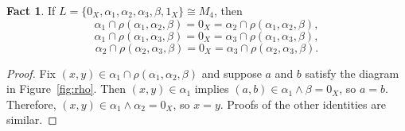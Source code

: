 \documentclass{amsart}
\theoremstyle{plain}
\theoremstyle{definition}
\newtheorem{fact}{Fact}
\theoremstyle{definition}
\numberwithin{equation}{section}
\newcommand{\<}{\ensuremath{\langle}}
\renewcommand{\>}{\ensuremath{\rangle}}
\newcommand{\meet}{\ensuremath{\wedge}}
\begin{document}
\begin{fact} If 
$L = \{0_X, \alpha_1, \alpha_2, \alpha_3, \beta, 1_X\} \cong  M_4$,
then
  \[
\alpha_1 \cap \rho(\alpha_1, \alpha_2, \beta)
= 0_X =  \alpha_2 \cap \rho(\alpha_1, \alpha_2, \beta),
\]
\[
\alpha_1 \cap \rho(\alpha_1, \alpha_3, \beta)
= 0_X =  \alpha_3 \cap \rho(\alpha_1, \alpha_3, \beta),
\]
\[
\alpha_2 \cap \rho(\alpha_2, \alpha_3, \beta)
 = 0_X = \alpha_3 \cap \rho(\alpha_2, \alpha_3, \beta).
\]
\end{fact}
\begin{proof}
  Fix $(x,y) \in  \alpha_1 \cap \rho(\alpha_1, \alpha_2, \beta)$ and suppose 
  $a$ and $b$ satisfy the diagram in Figure~\ref{fig:rho}.  Then 
  $(x,y) \in \alpha_1$ implies $(a, b)\in \alpha_1 \meet \beta = 0_X$, so 
  $a = b$.  Therefore, $(x,y) \in \alpha_1 \meet \alpha_2 = 0_X$, so $x = y$.
  Proofs of the other identities are similar.
\end{proof}
\end{document}
